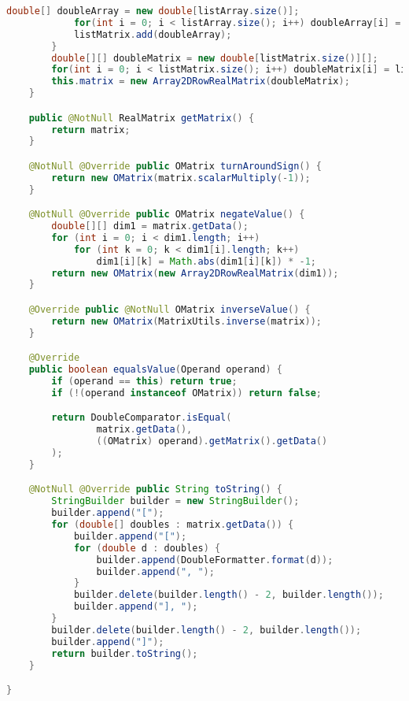 \begin{lstlisting}[caption=OMatrix (Meinerzhagen),label=list:OMatrix,language=Java]
            double[] doubleArray = new double[listArray.size()];
            for(int i = 0; i < listArray.size(); i++) doubleArray[i] = listArray.get(i);
            listMatrix.add(doubleArray);
        }
        double[][] doubleMatrix = new double[listMatrix.size()][];
        for(int i = 0; i < listMatrix.size(); i++) doubleMatrix[i] = listMatrix.get(i);
        this.matrix = new Array2DRowRealMatrix(doubleMatrix);
    }

    public @NotNull RealMatrix getMatrix() {
        return matrix;
    }

    @NotNull @Override public OMatrix turnAroundSign() {
        return new OMatrix(matrix.scalarMultiply(-1));
    }

    @NotNull @Override public OMatrix negateValue() {
        double[][] dim1 = matrix.getData();
        for (int i = 0; i < dim1.length; i++)
            for (int k = 0; k < dim1[i].length; k++)
                dim1[i][k] = Math.abs(dim1[i][k]) * -1;
        return new OMatrix(new Array2DRowRealMatrix(dim1));
    }

    @Override public @NotNull OMatrix inverseValue() {
        return new OMatrix(MatrixUtils.inverse(matrix));
    }

    @Override
    public boolean equalsValue(Operand operand) {
        if (operand == this) return true;
        if (!(operand instanceof OMatrix)) return false;

        return DoubleComparator.isEqual(
                matrix.getData(),
                ((OMatrix) operand).getMatrix().getData()
        );
    }

    @NotNull @Override public String toString() {
        StringBuilder builder = new StringBuilder();
        builder.append("[");
        for (double[] doubles : matrix.getData()) {
            builder.append("[");
            for (double d : doubles) {
                builder.append(DoubleFormatter.format(d));
                builder.append(", ");
            }
            builder.delete(builder.length() - 2, builder.length());
            builder.append("], ");
        }
        builder.delete(builder.length() - 2, builder.length());
        builder.append("]");
        return builder.toString();
    }

}
\end{lstlisting}    

